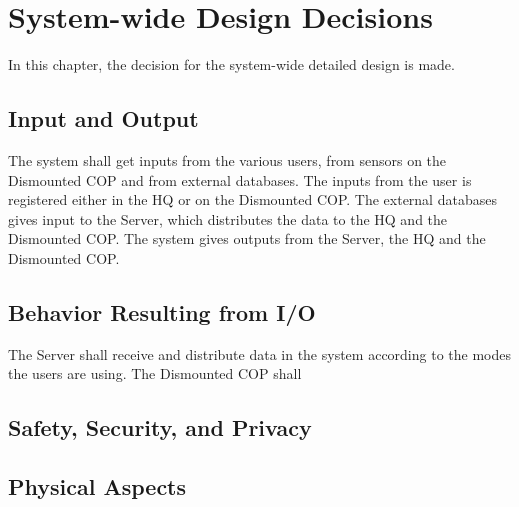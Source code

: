 \chapter{System-wide Design Decisions}

In this chapter, the decision for the system-wide detailed design is made.

\section{Input and Output}
The system shall get inputs from the various users, from sensors on the Dismounted COP and from external databases. The inputs from the user is registered either in the HQ or on the Dismounted COP. The external databases gives input to the Server, which distributes the data to the HQ and the Dismounted COP. The system gives outputs from the Server, the HQ and the Dismounted COP. 

\section{Behavior Resulting from I/O}
The Server shall receive and distribute data in the system according to the modes the users are using. The Dismounted COP shall 



\section{Safety, Security, and Privacy}

\section{Physical Aspects}

